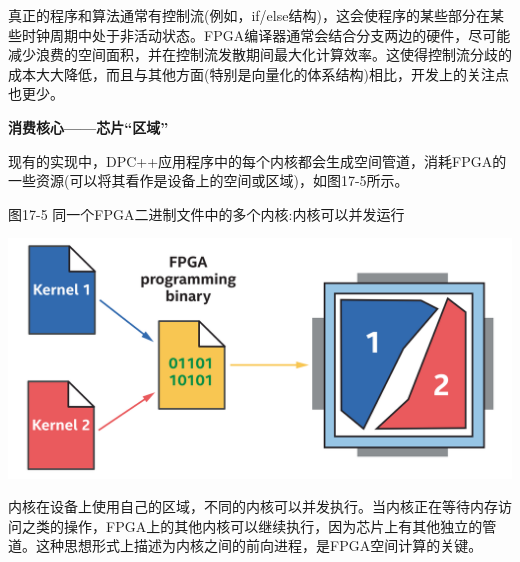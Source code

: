 真正的程序和算法通常有控制流(例如，if/else结构)，这会使程序的某些部分在某些时钟周期中处于非活动状态。FPGA编译器通常会结合分支两边的硬件，尽可能减少浪费的空间面积，并在控制流发散期间最大化计算效率。这使得控制流分歧的成本大大降低，而且与其他方面(特别是向量化的体系结构)相比，开发上的关注点也更少。\par

\hspace*{\fill} \par %
\textbf{消费核心——芯片“区域”}

现有的实现中，DPC++应用程序中的每个内核都会生成空间管道，消耗FPGA的一些资源(可以将其看作是设备上的空间或区域)，如图17-5所示。\par

\hspace*{\fill} \par %
图17-5 同一个FPGA二进制文件中的多个内核:内核可以并发运行
\begin{center}
	\includegraphics[width=1.0\textwidth]{content/chapter-17/images/6}
\end{center}

内核在设备上使用自己的区域，不同的内核可以并发执行。当内核正在等待内存访问之类的操作，FPGA上的其他内核可以继续执行，因为芯片上有其他独立的管道。这种思想形式上描述为内核之间的前向进程，是FPGA空间计算的关键。\par








